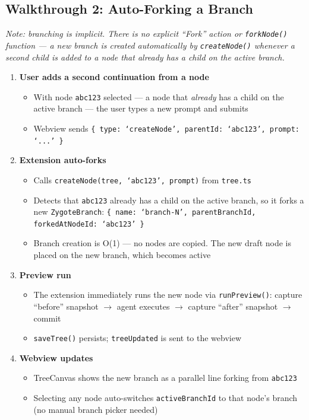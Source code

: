 \documentclass[12pt, a4paper]{article}
\begin{document}
\subsection{Walkthrough 2: Auto-Forking a Branch}

\textit{Note: branching is implicit. There is no explicit ``Fork'' action or \texttt{forkNode()} function --- a new branch is created automatically by \texttt{createNode()} whenever a second child is added to a node that already has a child on the active branch.}

\begin{enumerate}[label=\textbf{Step \arabic*:}, leftmargin=3cm]
    \item \textbf{User adds a second continuation from a node}
    \begin{itemize}
        \item With node \texttt{abc123} selected --- a node that \textit{already} has a child on the active branch --- the user types a new prompt and submits
        \item Webview sends \texttt{\{ type: `createNode', parentId: `abc123', prompt: `...' \}}
    \end{itemize}

    \item \textbf{Extension auto-forks}
    \begin{itemize}
        \item Calls \texttt{createNode(tree, `abc123', prompt)} from \texttt{tree.ts}
        \item Detects that \texttt{abc123} already has a child on the active branch, so it forks a new \texttt{ZygoteBranch}: \texttt{\{ name: `branch-N', parentBranchId, forkedAtNodeId: `abc123' \}}
        \item Branch creation is O(1) --- no nodes are copied. The new draft node is placed on the new branch, which becomes active
    \end{itemize}

    \item \textbf{Preview run}
    \begin{itemize}
        \item The extension immediately runs the new node via \texttt{runPreview()}: capture ``before'' snapshot $\to$ agent executes $\to$ capture ``after'' snapshot $\to$ commit
        \item \texttt{saveTree()} persists; \texttt{treeUpdated} is sent to the webview
    \end{itemize}

    \item \textbf{Webview updates}
    \begin{itemize}
        \item TreeCanvas shows the new branch as a parallel line forking from \texttt{abc123}
        \item Selecting any node auto-switches \texttt{activeBranchId} to that node's branch (no manual branch picker needed)
    \end{itemize}
\end{enumerate}
\end{document}
